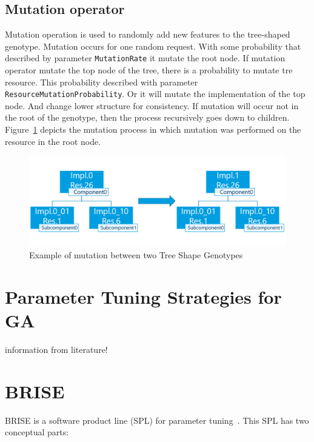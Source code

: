 \subsection{Mutation operator}
\label{sec:GeneticSolverMutation}
Mutation operation is used to randomly add new features to the tree-shaped genotype.
Mutation occurs for one random request. With some probability that described by parameter \texttt{MutationRate} it mutate the root node. If mutation operator mutate the top node of the tree, there is a probability to mutate tre resource. This probability described with parameter \texttt{ResourceMutationProbability}. Or it will mutate the implementation of the top node. And change lower structure for consistency. If mutation will occur not in the root of the genotype, then the process recursively goes down to children.  Figure~\ref{fig:GeneticSolverMutation} depicts the mutation process in which mutation was performed on the resource 
in the root node.

\begin{figure}
	\centering
	\includegraphics[width=\textwidth]{images/GeneticSolverMutation.png}
	\caption[Mutation in Tree Shape Genotype]{Example of mutation between two Tree Shape Genotypes}
	\label{fig:GeneticSolverMutation}
\end{figure}

\section{Parameter Tuning Strategies for GA}\label{sec:Parameter Tuning Strategies}

information from literature!

\section{BRISE}\label{sec:BRISE}

BRISE is a software product line (SPL) for parameter tuning~\cite{pukhkaiev19}.
This SPL has two conceptual parts:

